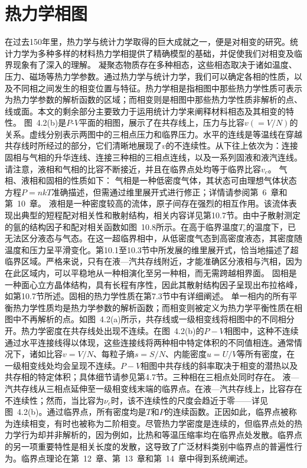 \section{热力学相图}\label{ux70edux529bux5b66ux76f8ux56fe}
在过去150年里，热力学与统计力学取得的巨大成就之一，便是对相变的研究。统计力学为多种多样的材料热力学相提供了精确模型的基础，并促使我们对相变及临界现象有了深入的理解。
凝聚态物质存在多种相态，这些相态取决于诸如温度、压力、磁场等热力学参数。通过热力学与统计力学，我们可以确定各相的性质，以及不同相之间发生的相变位置与特征。热力学相是指相图中那些热力学性质可表示为热力学参数的解析函数的区域；而相变则是相图中那些热力学性质非解析的点、线或面。本文的剩余部分主要致力于运用统计力学来阐释材料相态及其相变的特性。
图~4.2(b)是\(P\)-\(V\)平面的相图，展示了在共存线上，压力与比容\(v(=V/N)\)的关系。虚线分别表示两图中的三相点压力和临界压力。水平的连线是等温线在穿越共存线时所经过的部分，它们清晰地展现了\(v\)的不连续性。从下往上依次为：连接固相与气相的升华连线、连接三种相的三相点连线，以及一系列固液和液汽连线。请注意，液相和气相的比容不断接近，并且在临界点处均等于临界比容\(v_c\)。
气相、液相和固相的性质如下：
气相是一种低密度气体，其状态可由理想气体状态方程\(P = nkT\)准确描述，但需通过维里展开式进行修正；详情请参阅第~6~章和第~10~章。
液相是一种密度较高的流体，原子间存在强烈的相互作用。该流体表现出典型的短程配对相关性和散射结构，相关内容详见第10.7节。由中子散射测定的氩的结构因子和配对相关函数如图~10.8所示。在高于临界温度\(T_{c}\)的温度下，已无法区分液态与气态。在这一超临界相中，从低密度气态到高密度液态，其密度随温度和压力呈平滑变化。第10.1至10.3节中所发展的维里展开式，恰当地描述了超临界区域。严格来说，只有在液---汽共存线附近，才能准确区分液相与汽相，因为在此区域内，可以平稳地从一种相演化至另一种相，而无需跨越相界面。
固相是一种面心立方晶体结构，具有长程有序性，因此其散射结构因子呈现出布拉格峰，如第10.7节所述。固相的热力学性质在第7.3节中有详细阐述。
单一相内的所有平衡热力学性质均是热力学参数的解析函数；而相变则被定义为热力学平衡性质在相图中不再解析的点。如图~4.2(a)所示，共存线或一级相变线将相图中的不同相分开。热力学密度在共存线处出现不连续。在图~4.2(b)的\(P-V\)相图中，这种不连续通过水平连接线得以体现，这些连接线将两种相中特定体积的不同值相连。通常情况下，诸如比容\(v=V/N\)、每粒子熵\(s=S/N\)、内能密度\(u=U/V\)等所有密度，在一级相变线处均会呈现不连续。\(P-V\)相图中共存线的斜率取决于相变的潜热以及共存相的特定体积；具体细节请参见第4.7节。三种相在三相点处同时存在。
液---汽共存线从三相点延伸至一级相变线末端的临界点。在液---汽共存线上，比容存在不连续性；然而，当比容为\(\nu_{c}\)时，该不连续性的尺度会趋近于零——详见图~4.2(b)。通过临界点，所有密度均是\(T\)和\(P\)的连续函数。正因如此，临界点被称为连续相变，有时也被称为二阶相变。尽管热力学密度是连续的，但临界点处的热力学行为却并非解析的，因为例如，比热和等温压缩率均在临界点处发散。临界点的另一项重要特性是相关长度的发散，这导致了广泛材料类别中临界点的普遍性行为。临界点理论在第~12~章、第~13~章和第~14~章中得到系统阐述。
